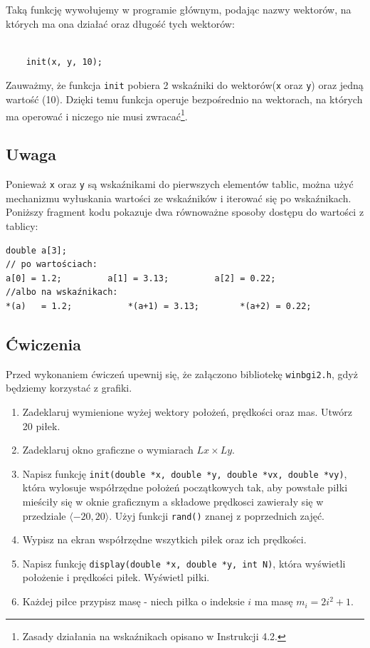 \documentclass{instrukcja}
\begin{document}
Taką funkcję wywołujemy w programie głównym, podając nazwy wektorów, na których ma ona działać oraz długość tych wektorów:

\begin{verbatim}

	init(x, y, 10);

\end{verbatim}

Zauważmy, że funkcja {\tt init} pobiera 2 wskaźniki do wektorów({\tt x} oraz {\tt y}) oraz jedną wartość (10). Dzięki temu funkcja operuje bezpośrednio na wektorach, na których ma operować i niczego nie musi zwracać\footnote{Zasady działania na wskaźnikach opisano w Instrukcji 4.2.}. 

\subsection*{Uwaga}
Ponieważ {\tt x} oraz {\tt y} są wskaźnikami do pierwszych elementów tablic, można użyć mechanizmu wyłuskania wartości ze wskaźników i iterować się po wskaźnikach. Poniższy fragment kodu pokazuje dwa równoważne sposoby dostępu do wartości z tablicy:

\begin{verbatim}
double a[3];
// po wartościach:
a[0] = 1.2;         a[1] = 3.13;         a[2] = 0.22;
//albo na wskaźnikach:
*(a)   = 1.2;           *(a+1) = 3.13;        *(a+2) = 0.22;
\end{verbatim}

\subsection*{Ćwiczenia}
Przed wykonaniem ćwiczeń upewnij się, że załączono bibliotekę \verb|winbgi2.h|, gdyż będziemy korzystać z grafiki.
\begin{enumerate}
\item Zadeklaruj wymienione wyżej wektory położeń, prędkości oraz mas. Utwórz 20 piłek.
\item Zadeklaruj okno graficzne o wymiarach \(Lx \times Ly\).
\item Napisz funkcję {\tt init(double *x, double *y, double *vx, double *vy)}, która wylosuje współrzędne położeń początkowych tak, aby powstałe piłki mieściły się w oknie graficznym a składowe prędkosci zawierały się w przedziale \(\langle-20,20\rangle\). Użyj funkcji \verb|rand()| znanej z poprzednich zajęć.
\item Wypisz na ekran współrzędne wszytkich piłek oraz ich prędkości.
\item Napisz funkcję {\tt display(double *x, double *y, int N)}, która wyświetli położenie i prędkości piłek. Wyświetl piłki.
\item Każdej piłce przypisz masę - niech piłka o indeksie \(i\) ma masę \(m_i=2i^2 + 1\).
\end{enumerate}
\end{document}
